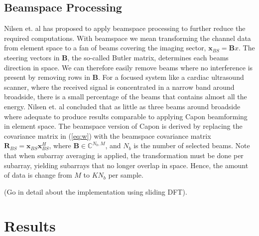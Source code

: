 \documentclass[journal]{IEEEtran}
\newcommand{\mat}[1]{\mathbf{#1}}
\renewcommand{\vec}[1]{\mathbf{#1}}
\begin{document}
\subsection{Beamspace Processing}
Nilsen et. al \cite{Nilsen2009} has proposed to apply beamspace processing to further reduce the required computations. With beamspace we mean transforming the channel data from element space to a fan of beams covering the imaging sector, $\vec{x}_{BS} = \mat{B}x$.  The steering vectors in $\mat{B}$, the so-called Butler matrix, determines each beams direction in space. We can therefore easily remove beams where no interference is present by removing rows in $\mat{B}$. For a focused system like a cardiac ultrasound scanner, where the received signal is concentrated in a narrow band around broadside, there is a small percentage of the beams that contains almost all the energy. Nilsen et. al concluded that as little as three beams around broadside where adequate to produce results comparable to applying Capon beamforming in element space. The beamspace version of Capon is derived by replacing the covariance matrix in (\ref{eq:w}) with the beamspace covariance matrix $\mat{R}_{BS} = \vec{x}_{BS}\vec{x}_{BS}^H$, where $\mat{B} \in \mathbb{C}^{N_b,M}$, and $N_b$ is the number of selected beams. Note that when subarray averaging is applied, the transformation must be done per subarray, yielding subarrays that no longer overlap in space. Hence, the amount of data is change from $M$ to $KN_b$ per sample.

(Go in detail about the implementation using sliding DFT).


\section{Results}\label{sec:res}
\end{document}
